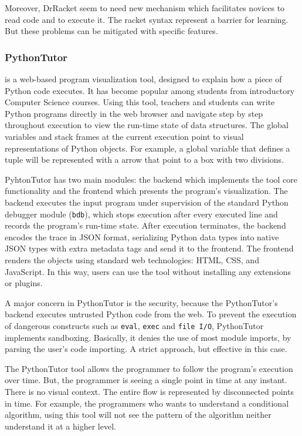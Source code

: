 Moreover, DrRacket seem to need new mechanism which facilitates novices to read code and to execute it. The racket syntax represent a barrier for learning. But these problems can be mitigated with specific features.
\subsubsection{PythonTutor~\cite{GuoSIGCSE2013}} is a web-based program visualization tool, designed to explain how a piece of Python code executes. It has become popular among students from introductory Computer Science courses. Using this tool, teachers and students can write Python programs directly in the web browser and navigate step by step throughout execution to view the run-time state of data structures. The global variables and stack frames at the current execution point to visual representations of Python objects. For example, a global variable that defines a tuple will be represented with a arrow that point to a box with two divisions.

PyhtonTutor has two main modules: the backend which implements the tool core functionality and the frontend which presents the program's visualization. The backend executes the input program under supervision of the standard Python debugger module (\texttt{bdb}), which stops execution after every executed line and records the program's run-time state. After execution terminates, the backend encodes the trace in JSON format, serializing Python data types into native JSON types with extra metadata tags and send it to the frontend. The frontend renders the objects using standard web technologies: HTML, CSS, and JavaScript. In this way, users can use the tool without installing any extensions or plugins.

A major concern in PythonTutor is the security, because the PythonTutor's backend executes untrusted Python code from the web. To prevent the execution of dangerous constructs such as {\tt eval}, {\tt exec} and {\tt file I/O}, PythonTutor implements sandboxing. Basically, it denies the use of most module imports, by parsing the user's code importing. A strict approach, but effective in this case.

The PythonTutor tool allows the programmer to follow the program's execution over time. But, the programmer is seeing a single point in time at any instant. There is no visual context. The entire flow is represented by disconnected points in time. For example, the programmers who wants to understand a conditional algorithm, using this tool will not see the pattern of the algorithm neither understand it at a higher level.
